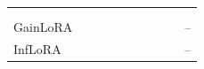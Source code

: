 {\begin{tabular}{p{1.2in}rrrrrrrrr}
    \centre{} & \AudUThreeOriginalCentreAP{} & \AudUThreeLightCentreAP{} & \AudUThreeMediumCentreAP{} & \AudUThreeHeavyCentreAP{} & \AudUThreeOriginalCentreChanged{} & \AudUThreeLightCentreChanged{} & \AudUThreeMediumCentreChanged{} & \AudUThreeHeavyCentreChanged{} & \AudUThreeHeavyCentreRight{} \\
    \plain{} & \AudUThreeOriginalPlainAP{} & \AudUThreeLightPlainAP{} & \AudUThreeMediumPlainAP{} & \AudUThreeHeavyPlainAP{} & \AudUThreeOriginalPlainChanged{} & \AudUThreeLightPlainChanged{} & \AudUThreeMediumPlainChanged{} & \AudUThreeHeavyPlainChanged{} & \AudUThreeHeavyPlainRight{} \\
    \midrule
    GainLoRA & \AudUThreeOriginalGainloraAP{} & \AudUThreeLightGainloraAP{} & \AudUThreeMediumGainloraAP{} & \AudUThreeHeavyGainloraAP{} & \AudUThreeOriginalGainloraChanged{} & \AudUThreeLightGainloraChanged{} & \AudUThreeMediumGainloraChanged{} & \AudUThreeHeavyGainloraChanged{} & -- \\
    InfLoRA & \AudUThreeOriginalInfloraAP{} & \AudUThreeLightInfloraAP{} & \AudUThreeMediumInfloraAP{} & \AudUThreeHeavyInfloraAP{} & \AudUThreeOriginalInfloraChanged{} & \AudUThreeLightInfloraChanged{} & \AudUThreeMediumInfloraChanged{} & \AudUThreeHeavyInfloraChanged{} & -- \\
    \bottomrule
\end{tabular}}
